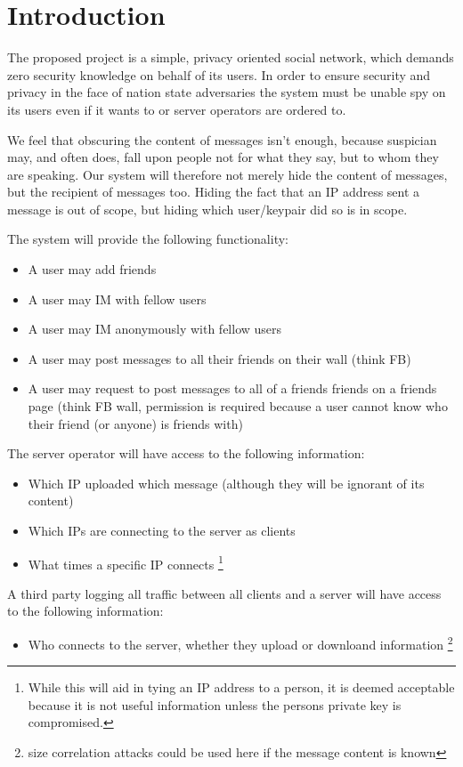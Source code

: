 \section{Introduction}
The proposed project is a simple, privacy oriented social network, which demands
zero security knowledge on behalf of its users. In order to ensure security and
privacy in the face of nation state adversaries the system must be unable spy on
its users even if it wants to or server operators are ordered to.

We feel that obscuring the content of messages isn't enough, because suspician
may, and often does, fall upon people not for what they say, but to whom they
are speaking. Our system will therefore not merely hide
the content of messages, but the recipient of messages too. Hiding the fact that
an IP address sent a message is out of scope, but hiding which user/keypair did
so is in scope.

The system will provide the following functionality:
\begin{itemize}
\item A user may add friends
\item A user may IM with fellow users
\item A user may IM anonymously with fellow users
\item A user may post messages to all their friends on their wall (think FB)
\item A user may request to post messages to all of a friends friends on a
friends page (think FB wall, permission is required because a user cannot know
who their friend (or anyone) is friends with)
\end{itemize}

The server operator will have access to the following information:
\begin{itemize}
\item Which IP uploaded which message (although they will be ignorant of its
content)
\item Which IPs are connecting to the server as clients
\item What times a specific IP connects \footnote {While this will aid in tying
an IP address to a person, it is deemed acceptable because it is not useful
information unless the persons private key is compromised.}
\end{itemize}

A third party logging all traffic between all clients and a server will have
access to the following information: 
\begin{itemize}
\item Who connects to the server, whether they upload or downloand information
\footnote{size correlation attacks could be used here if the message content is
known}
\end{itemize}

